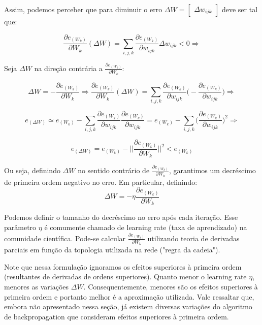 \documentclass[
	12pt,				%
	oneside,			%
	a4paper,			%
	english,			%
	french,				%
	spanish,			%
	brazil,				%
	]{abntex2}
\begin{document}
Assim, podemos perceber que para diminuir o erro $\Delta W = \begin{bmatrix}
\Delta w_{ijk}
\end{bmatrix}$ deve ser tal que:

$$ \frac{ \partial e_{(W_{k})} } { \partial W_k }(\Delta W) = \sum_{i,j,k} \frac{ \partial e_{(W_{k})} } { \partial w_{ijk} } \Delta w_{ijk} < 0  \Rightarrow $$

Seja $\Delta W$ na dire\c{c}\~ao contr\'aria a $ \frac{ \partial e_{(W_{k})} } { \partial W_k }$:

$$\Delta W = -  \frac{ \partial e_{(W_{k})} } { \partial W_k } \Rightarrow 
\frac{ \partial e_{(W_{k})} } { \partial W_k }(\Delta W) = 
\sum_{i,j,k} \frac{ \partial e_{(W_{k})} } { \partial w_{ijk} } \Big( - \frac{ \partial e_{(W_{k})} } { \partial w_{ijk} } \Big ) \Rightarrow $$

$$ e_{(\Delta W)} \simeq e_{(W_k)}
- \sum_{i,j,k} \frac{ \partial e_{(W_{k})} } { \partial w_{ijk} } \frac{ \partial e_{(W_{k})} } { \partial w_{ijk} }
=
e_{(W_k)}
- \sum_{i,j,k} \Big( \frac{ \partial e_{(W_{k})} } { \partial w_{ijk} } \Big)^2 \Rightarrow
$$

$$e_{(\Delta W)} = e_{(W_k)}
- \bigg|\bigg|  \frac{ \partial e_{(W_{k})} } { \partial W_k } \bigg|\bigg|^2 < e_{(W_k)}$$

Ou seja, definindo $\Delta W$ no sentido contr\'ario de $ \frac{ \partial e_{(W_{k})} } { \partial W_k }$, garantimos um decr\'escimo de primeira ordem negativo no erro. Em particular, definindo: 
$$\Delta W = - \eta  \frac{ \partial e_{(W_{k})} } { \partial W_k }  $$

Podemos definir o tamanho do decr\'escimo no erro ap\'os cada itera\c{c}\~ao. Esse par\^ametro $\eta$ \'e comumente chamado de learning rate (taxa de aprendizado) na comunidade cient\'ifica. Pode-se calcular $ \frac{ \partial e_{(W_{k})} } { \partial W_k }$ utilizando teoria de derivadas parciais em fun\c{c}\~ao da topologia utilizada na rede ("regra da cadeia").

Note que nessa formula\c{c}\~ao ignoramos os efeitos superiores \`a primeira ordem (resultantes de derivadas de ordens superiores). Quanto menor o learning rate $\eta$, menores as varia\c{c}\~oes $\Delta W$. Consequentemente, menores s\~ao os efeitos superiores \`a primeira ordem e portanto melhor \'e a aproxima\c{c}\~ao utilizada. Vale ressaltar que, embora n\~ao apresentado nessa se\c{c}\~ao, j\'a existem diversas varia\c{c}\~oes do algoritmo de backpropagation que consideram efeitos superiores \`a primeira ordem. 
\end{document}
